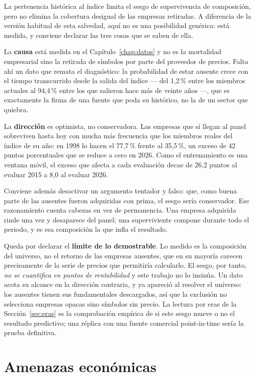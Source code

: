 La pertenencia histórica al índice limita el sesgo de supervivencia de composición, pero no elimina
la cobertura desigual de las empresas retiradas. A diferencia de la versión habitual de esta
salvedad, aquí no es una posibilidad genérica: está medida, y conviene declarar las tres cosas que
se saben de ella.

La \textbf{causa} está medida en el Capítulo~\ref{chap:datos} y no es la mortalidad empresarial sino
la retirada de símbolos por parte del proveedor de precios. Falta ahí un dato que remata el
diagnóstico: la probabilidad de estar ausente crece con el tiempo transcurrido desde la salida del
índice --- del 1,2\,\% entre los miembros actuales al 94,4\,\% entre los que salieron hace más de
veinte años ---, que es exactamente la firma de una fuente que poda su histórico, no la de un sector
que quiebra.

La \textbf{dirección} es optimista, no conservadora. Las empresas que sí llegan al panel sobreviven
hasta hoy con mucha más frecuencia que los miembros reales del índice de su año: en 1998 lo hacen el
77,7\,\% frente al 35,5\,\%, un exceso de 42 puntos porcentuales que se reduce a cero en 2026. Como
el entrenamiento es una ventana móvil, el exceso que afecta a cada evaluación decae de 26,2 puntos
al evaluar 2015 a 8,0 al evaluar 2026.

Conviene además desactivar un argumento tentador y falso: que, como buena parte de las ausentes
fueron adquiridas con prima, el sesgo sería conservador. Ese razonamiento cuenta cabezas en vez de
permanencia. Una empresa adquirida rinde una vez y desaparece del panel; una superviviente compone
durante todo el periodo, y es esa composición la que infla el resultado.

Queda por declarar el \textbf{límite de lo demostrable}. Lo medido es la composición del universo,
no el retorno de las empresas ausentes, que en su mayoría carecen precisamente de la serie de
precios que permitiría calcularlo. El sesgo, por tanto, \emph{no se cuantifica en puntos de
rentabilidad} y este trabajo no lo insinúa. Un dato acota su alcance en la dirección contraria, y ya
apareció al resolver el universo: los ausentes tienen sus fundamentales descargados, así que la
exclusión no selecciona empresas opacas sino símbolos sin precio. La lectura por eras de la Sección~\ref{sec:eras} es la comprobación
empírica de si este sesgo mueve o no el resultado predictivo; una réplica con una fuente comercial
point-in-time sería la prueba definitiva.

\section{Amenazas económicas}

